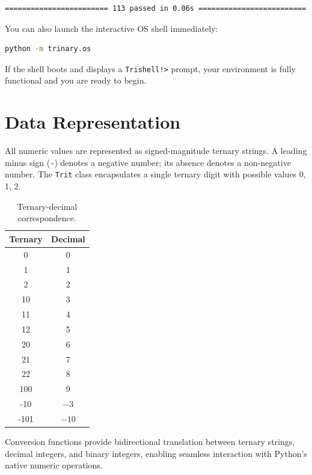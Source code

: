 \documentclass[11pt,a4paper]{article}
\begin{document}
\begin{lstlisting}[basicstyle=\ttfamily\footnotesize]
======================== 113 passed in 0.06s =========================
\end{lstlisting}

You can also launch the interactive OS shell immediately:

\begin{lstlisting}[language=bash]
python -m trinary.os
\end{lstlisting}

If the shell boots and displays a \texttt{Trishell!>} prompt, your
environment is fully functional and you are ready to begin.

\section{Data Representation}
\label{sec:data}

All numeric values are represented as signed-magnitude ternary strings.  A
leading minus sign (\texttt{-}) denotes a negative number; its absence denotes
a non-negative number.  The \texttt{Trit} class encapsulates a single ternary
digit with possible values 0, 1, 2.

\begin{table}[H]
  \centering
  \caption{Ternary-decimal correspondence.}
  \label{tab:ternary-decimal}
  \begin{tabular}{c|c}
    \textbf{Ternary} & \textbf{Decimal} \\ \hline
    0      & 0  \\
    1      & 1  \\
    2      & 2  \\
    10     & 3  \\
    11     & 4  \\
    12     & 5  \\
    20     & 6  \\
    21     & 7  \\
    22     & 8  \\
    100    & 9  \\
    -10    & $-3$ \\
    -101   & $-10$
  \end{tabular}
\end{table}

Conversion functions provide bidirectional translation between ternary strings,
decimal integers, and binary integers, enabling seamless interaction with
Python's native numeric operations.
\end{document}
